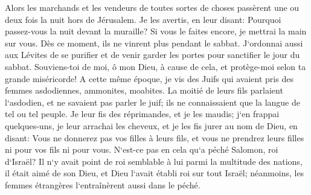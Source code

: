 \verse Alors les marchands et les vendeurs de toutes sortes de choses passèrent une ou deux fois la nuit hors de Jérusalem. 
\verse Je les avertis, en leur disant: Pourquoi passez-vous la nuit devant la muraille? Si vous le faites encore, je mettrai la main sur vous. Dès ce moment, ils ne vinrent plus pendant le sabbat. 
\verse J`ordonnai aussi aux Lévites de se purifier et de venir garder les portes pour sanctifier le jour du sabbat. Souviens-toi de moi, ô mon Dieu, à cause de cela, et protège-moi selon ta grande miséricorde! 
\verse A cette même époque, je vis des Juifs qui avaient pris des femmes asdodiennes, ammonites, moabites. 
\verse La moitié de leurs fils parlaient l`asdodien, et ne savaient pas parler le juif; ils ne connaissaient que la langue de tel ou tel peuple. 
\verse Je leur fis des réprimandes, et je les maudis; j`en frappai quelques-uns, je leur arrachai les cheveux, et je les fis jurer au nom de Dieu, en disant: Vous ne donnerez pas vos filles à leurs fils, et vous ne prendrez leurs filles ni pour vos fils ni pour vous. 
\verse N`est-ce pas en cela qu`a péché Salomon, roi d`Israël? Il n`y avait point de roi semblable à lui parmi la multitude des nations, il était aimé de son Dieu, et Dieu l`avait établi roi sur tout Israël; néanmoins, les femmes étrangères l`entraînèrent aussi dans le péché. 
